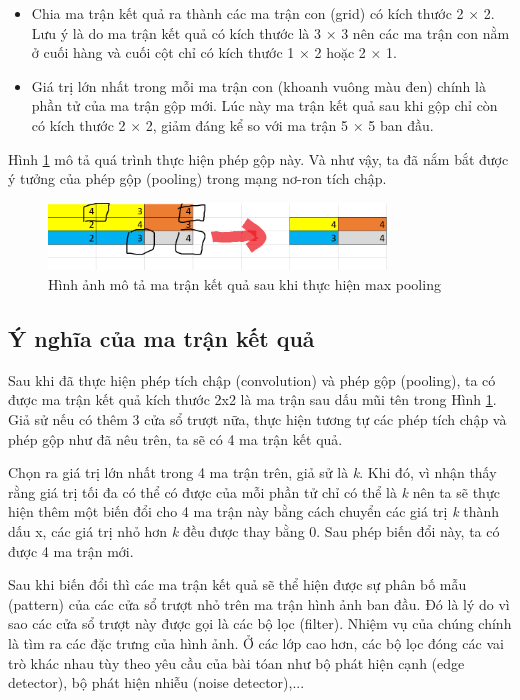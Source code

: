 \documentclass[a4paper]{article}
\begin{document}
\begin{itemize}
    \item Chia ma trận kết quả ra thành các ma trận con (grid) có kích thước 2 × 2. Lưu ý là do ma trận kết quả có kích thước là 3 × 3 nên các ma trận con nằm ở cuối hàng và cuối cột chỉ có kích thước 1 × 2 hoặc 2 × 1.
    \item Giá trị lớn nhất trong mỗi ma trận con (khoanh vuông màu đen) chính là phần tử của ma trận gộp mới. Lúc này ma trận kết quả sau khi gộp chỉ còn có kích thước 2 × 2, giảm đáng kể so với ma trận 5 × 5 ban đầu.
\end{itemize}

Hình \ref{fig:pooling} mô tả quá trình thực hiện phép gộp này. Và như vậy, ta đã nắm bắt được ý tưởng của phép gộp (pooling) trong mạng nơ-ron tích chập.

\begin{figure}[h]
    \centering
    \includegraphics[width=0.8\textwidth]{image/pooling.png}
    \caption{Hình ảnh mô tả ma trận kết quả sau khi thực hiện max pooling}
    \label{fig:pooling}
\end{figure}

\subsection{Ý nghĩa của ma trận kết quả}
Sau khi đã thực hiện phép tích chập (convolution) và phép gộp (pooling), ta có được ma trận kết quả kích thước 2x2 là ma trận sau dấu mũi tên trong Hình \ref{fig:pooling}. Giả sử nếu có thêm 3 cửa sổ trượt nữa, thực hiện tương tự các phép tích chập và phép gộp như đã nêu trên, ta sẽ có 4 ma trận kết quả.

Chọn ra giá trị lớn nhất trong 4 ma trận trên, giả sử là \textit{k}. Khi đó, vì nhận thấy rằng giá trị tối đa có thể có được của mỗi phần tử chỉ có thể là \textit{k} nên ta sẽ thực hiện thêm một biến đổi cho 4 ma trận này bằng cách chuyển các giá trị \textit{k} thành dấu x, các giá trị nhỏ hơn \textit{k} đều được thay bằng 0. Sau phép biến đổi này, ta có được 4 ma trận mới.

Sau khi biến đổi thì các ma trận kết quả sẽ thể hiện được sự phân bố mẫu (pattern) của các cửa sổ trượt nhỏ trên ma trận hình ảnh ban đầu. Đó là lý do vì sao các cửa sổ trượt này được gọi là các bộ lọc (filter). Nhiệm vụ của chúng chính là tìm ra các đặc trưng của hình ảnh. Ở các lớp cao hơn, các bộ lọc đóng các vai trò khác nhau tùy theo yêu cầu của bài tóan như bộ phát hiện cạnh (edge detector), bộ phát hiện nhiễu (noise detector),...
\end{document}
